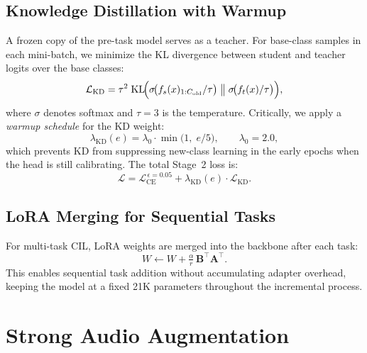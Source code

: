 \documentclass{Interspeech}
\begin{document}
\subsection{Knowledge Distillation with Warmup}
\label{sec:kd}

A frozen copy of the pre-task model serves as a teacher.
For base-class samples in each mini-batch, we minimize the KL divergence between student and teacher logits over the base classes:
\begin{equation}
\mathcal{L}_\text{KD}
  = \tau^2 \;\text{KL}\!\Bigl(
      \sigma\!\bigl(f_s(x)_{1:C_\text{old}}/\tau\bigr)
      \;\big\|\;
      \sigma\!\bigl(f_t(x)/\tau\bigr)
    \Bigr),
\label{eq:kd}
\end{equation}
where $\sigma$ denotes softmax and $\tau{=}3$ is the temperature.
Critically, we apply a \emph{warmup schedule} for the KD weight:
\begin{equation}
\lambda_\text{KD}(e) = \lambda_0 \cdot \min\!\bigl(1,\; e/5\bigr),
\qquad \lambda_0 = 2.0,
\label{eq:kdwarmup}
\end{equation}
which prevents KD from suppressing new-class learning in the early epochs when the head is still calibrating.
The total Stage~2 loss is:
\begin{equation}
\mathcal{L} = \mathcal{L}_\text{CE}^{\,\epsilon=0.05} + \lambda_\text{KD}(e) \cdot \mathcal{L}_\text{KD}.
\label{eq:total}
\end{equation}

\subsection{LoRA Merging for Sequential Tasks}
\label{sec:merge}

For multi-task CIL, LoRA weights are merged into the backbone after each task:
\begin{equation}
W \leftarrow W + \tfrac{\alpha}{r}\,\mathbf{B}^\top\!\mathbf{A}^\top.
\label{eq:merge}
\end{equation}
This enables sequential task addition without accumulating adapter overhead, keeping the model at a fixed 21K parameters throughout the incremental process.

\section{Strong Audio Augmentation}
\label{sec:augment}
\end{document}
